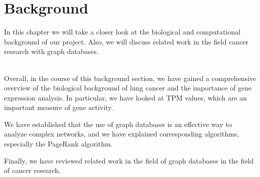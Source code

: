 \section{Background} \label{sec:background}

In this chapter we will take a closer look at the biological and computational background of our project.
Also, we will discuss related work in the field cancer research with graph databases.






\\


Overall, in the course of this background section,
we have gained a comprehensive overview of the biological background of lung cancer and
the importance of gene expression analysis.
In particular, we have looked at TPM values, which are an important measure of gene activity.

We have established that the use of graph databases is an effective way to analyze complex networks,
and we have explained corresponding algorithms, especially the PageRank algorithm.

Finally, we have reviewed related work in the field of graph databases in the field of cancer research.
